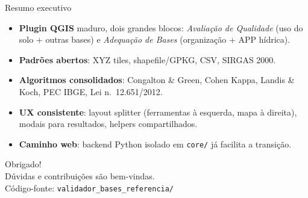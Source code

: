 \documentclass[10pt,aspectratio=169]{beamer}
\begin{document}
\begin{frame}{Resumo executivo}
  \begin{itemize}
    \item \textbf{Plugin QGIS} maduro, dois grandes blocos: \emph{Avaliação de Qualidade} (uso do solo + outras bases) e \emph{Adequação de Bases} (organização + APP hídrica).
    \item \textbf{Padrões abertos}: XYZ tiles, shapefile/GPKG, CSV, SIRGAS 2000.
    \item \textbf{Algoritmos consolidados}: Congalton \& Green, Cohen Kappa, Landis \& Koch, PEC IBGE, Lei n.\ 12.651/2012.
    \item \textbf{UX consistente}: layout splitter (ferramentas à esquerda, mapa à direita), modais para resultados, helpers compartilhados.
    \item \textbf{Caminho web}: backend Python isolado em \texttt{core/} já facilita a transição.
  \end{itemize}
\end{frame}

\begin{frame}
  \centering
  {\Huge Obrigado!}\\[6mm]
  Dúvidas e contribuições são bem-vindas.\\[4mm]
  \small Código-fonte: \texttt{validador\_bases\_referencia/}
\end{frame}
\end{document}
